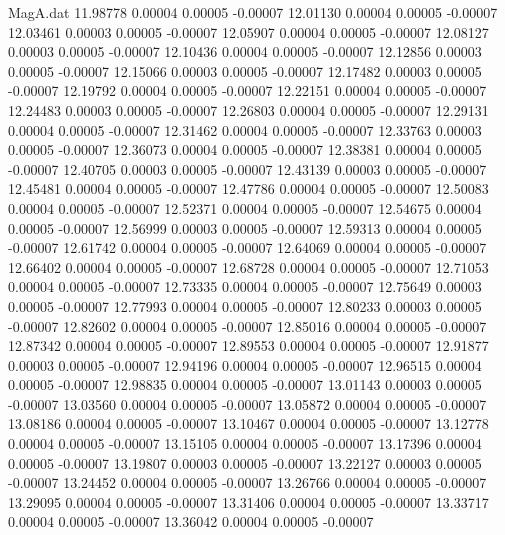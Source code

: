 \begin{filecontents}{MagA.dat}
  11.98778    0.00004    0.00005   -0.00007
  12.01130    0.00004    0.00005   -0.00007
  12.03461    0.00003    0.00005   -0.00007
  12.05907    0.00004    0.00005   -0.00007
  12.08127    0.00003    0.00005   -0.00007
  12.10436    0.00004    0.00005   -0.00007
  12.12856    0.00003    0.00005   -0.00007
  12.15066    0.00003    0.00005   -0.00007
  12.17482    0.00003    0.00005   -0.00007
  12.19792    0.00004    0.00005   -0.00007
  12.22151    0.00004    0.00005   -0.00007
  12.24483    0.00003    0.00005   -0.00007
  12.26803    0.00004    0.00005   -0.00007
  12.29131    0.00004    0.00005   -0.00007
  12.31462    0.00004    0.00005   -0.00007
  12.33763    0.00003    0.00005   -0.00007
  12.36073    0.00004    0.00005   -0.00007
  12.38381    0.00004    0.00005   -0.00007
  12.40705    0.00003    0.00005   -0.00007
  12.43139    0.00003    0.00005   -0.00007
  12.45481    0.00004    0.00005   -0.00007
  12.47786    0.00004    0.00005   -0.00007
  12.50083    0.00004    0.00005   -0.00007
  12.52371    0.00004    0.00005   -0.00007
  12.54675    0.00004    0.00005   -0.00007
  12.56999    0.00003    0.00005   -0.00007
  12.59313    0.00004    0.00005   -0.00007
  12.61742    0.00004    0.00005   -0.00007
  12.64069    0.00004    0.00005   -0.00007
  12.66402    0.00004    0.00005   -0.00007
  12.68728    0.00004    0.00005   -0.00007
  12.71053    0.00004    0.00005   -0.00007
  12.73335    0.00004    0.00005   -0.00007
  12.75649    0.00003    0.00005   -0.00007
  12.77993    0.00004    0.00005   -0.00007
  12.80233    0.00003    0.00005   -0.00007
  12.82602    0.00004    0.00005   -0.00007
  12.85016    0.00004    0.00005   -0.00007
  12.87342    0.00004    0.00005   -0.00007
  12.89553    0.00004    0.00005   -0.00007
  12.91877    0.00003    0.00005   -0.00007
  12.94196    0.00004    0.00005   -0.00007
  12.96515    0.00004    0.00005   -0.00007
  12.98835    0.00004    0.00005   -0.00007
  13.01143    0.00003    0.00005   -0.00007
  13.03560    0.00004    0.00005   -0.00007
  13.05872    0.00004    0.00005   -0.00007
  13.08186    0.00004    0.00005   -0.00007
  13.10467    0.00004    0.00005   -0.00007
  13.12778    0.00004    0.00005   -0.00007
  13.15105    0.00004    0.00005   -0.00007
  13.17396    0.00004    0.00005   -0.00007
  13.19807    0.00003    0.00005   -0.00007
  13.22127    0.00003    0.00005   -0.00007
  13.24452    0.00004    0.00005   -0.00007
  13.26766    0.00004    0.00005   -0.00007
  13.29095    0.00004    0.00005   -0.00007
  13.31406    0.00004    0.00005   -0.00007
  13.33717    0.00004    0.00005   -0.00007
  13.36042    0.00004    0.00005   -0.00007

\end{filecontents}
